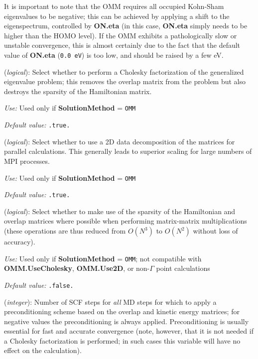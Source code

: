 \documentclass[11pt]{article}
\begin{document}
It is important to note that the OMM requires all occupied Kohn-Sham
eigenvalues to be negative; this can be achieved by applying a shift
to the eigenspectrum, controlled by {\bf ON.eta} (in this case,
{\bf ON.eta} simply needs to be higher than the HOMO level). If the OMM
exhibits a pathologically slow or unstable convergence, this is almost
certainly due to the fact that the default value of {\bf ON.eta}
({\tt 0.0 eV}) is too low, and should be raised by a few eV.

\begin{description}
\itemsep 10pt
\parsep 0pt

\item[{\bf OMM.UseCholesky}] ({\it logical}):
Select whether to perform a Cholesky factorization of the generalized eigenvalue
problem; this removes the overlap matrix from the problem but also destroys the
sparsity of the Hamiltonian matrix.

{\it Use:} Used only if {\bf SolutionMethod} = {\tt OMM}

{\it Default value:} {\tt .true.}

\item[{\bf OMM.Use2D}] ({\it logical}):
Select whether to use a 2D data decomposition of the matrices for parallel
calculations. This generally leads to superior scaling for large numbers of MPI
processes.

{\it Use:} Used only if {\bf SolutionMethod} = {\tt OMM}

{\it Default value:} {\tt .true.}

\item[{\bf OMM.UseSparse}] ({\it logical}):
Select whether to make use of the sparsity of the Hamiltonian and overlap
matrices where possible when performing matrix-matrix multiplications (these
operations are thus reduced from $O(N^3)$ to $O(N^2)$ without loss of
accuracy).

{\it Use:} Used only if {\bf SolutionMethod} = {\tt OMM}; not compatible with
{\bf OMM.UseCholesky}, {\bf OMM.Use2D}, or non-$\Gamma$ point calculations

{\it Default value:} {\tt .false.}

\item[{\bf OMM.Precon}] ({\it integer}):
Number of SCF steps for {\em all} MD steps for which to apply a preconditioning
scheme based on the overlap and kinetic energy matrices; for negative values the
preconditioning is always applied. Preconditioning is usually essential for fast
and accurate convergence (note, however, that it is not needed if a Cholesky
factorization is performed; in such cases this variable will have no effect on
the calculation).


\end{description}
\end{document}
